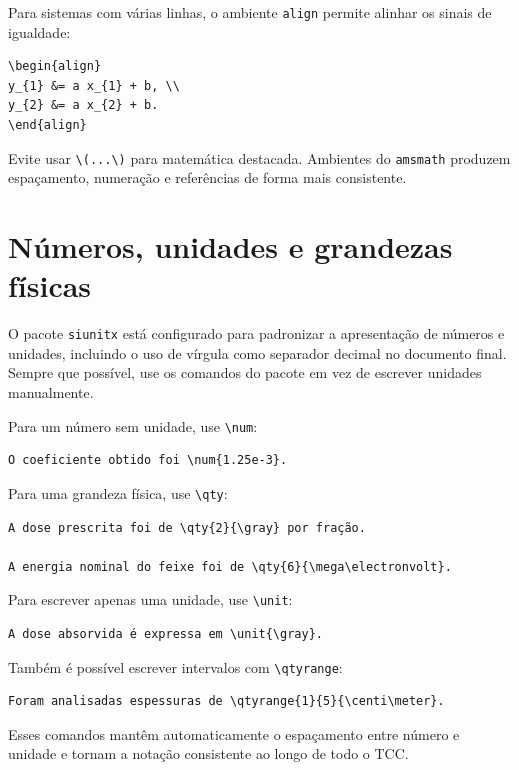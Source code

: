 Para sistemas com várias linhas, o ambiente \verb|align| permite alinhar os sinais de igualdade:

\begin{verbatim}
\begin{align}
y_{1} &= a x_{1} + b, \\
y_{2} &= a x_{2} + b.
\end{align}
\end{verbatim}

Evite usar \verb|\(...\)| para matemática destacada. Ambientes do \verb|amsmath| produzem espaçamento, numeração e referências de forma mais consistente.

\section{Números, unidades e grandezas físicas}
\label{sec:siunitx}

O pacote \verb|siunitx| está configurado para padronizar a apresentação de números e unidades, incluindo o uso de vírgula como separador decimal no documento final. Sempre que possível, use os comandos do pacote em vez de escrever unidades manualmente.

Para um número sem unidade, use \verb|\num|:

\begin{verbatim}
O coeficiente obtido foi \num{1.25e-3}.
\end{verbatim}

Para uma grandeza física, use \verb|\qty|:

\begin{verbatim}
A dose prescrita foi de \qty{2}{\gray} por fração.

A energia nominal do feixe foi de \qty{6}{\mega\electronvolt}.
\end{verbatim}

Para escrever apenas uma unidade, use \verb|\unit|:

\begin{verbatim}
A dose absorvida é expressa em \unit{\gray}.
\end{verbatim}

Também é possível escrever intervalos com \verb|\qtyrange|:

\begin{verbatim}
Foram analisadas espessuras de \qtyrange{1}{5}{\centi\meter}.
\end{verbatim}

Esses comandos mantêm automaticamente o espaçamento entre número e unidade e tornam a notação consistente ao longo de todo o TCC.

